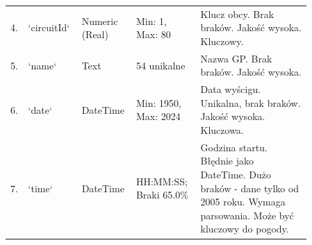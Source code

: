 \documentclass[a4paper,12pt]{article}
\begin{document}
\begin{longtable}{|p{0.03\linewidth}|p{0.15\linewidth}|p{0.13\linewidth}|p{0.2\linewidth}|p{0.35\linewidth}|}
  \tiny 4.          & \tiny `circuitId`     & \tiny Numeric (Real)     & \tiny Min: 1, Max: 80         & \tiny Klucz obcy. Brak braków. Jakość wysoka. Kluczowy.                                                                             \\
  \tiny 5.          & \tiny `name`          & \tiny Text               & \tiny 54 unikalne             & \tiny Nazwa GP. Brak braków. Jakość wysoka.                                                                                         \\
  \tiny 6.          & \tiny `date`          & \tiny DateTime           & \tiny Min: 1950, Max: 2024    & \tiny Data wyścigu. Unikalna, brak braków. Jakość wysoka. Kluczowa.                                                                 \\
  \tiny 7.          & \tiny `time`          & \tiny DateTime           & \tiny HH:MM:SS; Braki 65.0\%  & \tiny Godzina startu. Błędnie jako DateTime. Dużo braków - dane tylko od 2005 roku. Wymaga parsowania. Może być kluczowy do pogody. \\
\end{longtable}
\end{document}
